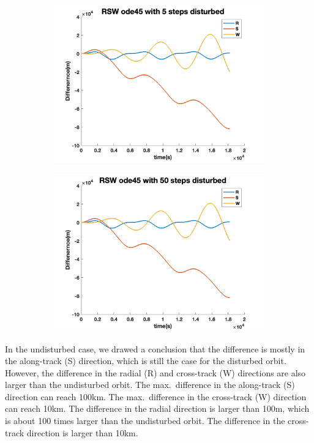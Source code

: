 \documentclass[12pt
,headinclude
,headsepline
,bibtotocnumbered
]{scrartcl}
\begin{document}
\begin{figure}[H]
\begin{subfigure}[b]{0.45\textwidth}
        \end{subfigure}
        \begin{subfigure}[b]{0.45\textwidth}
        \includegraphics[width=1\textwidth]{./plots/ode45_5_yprime_d_RSW.png}
        \end{subfigure}
        \begin{subfigure}[b]{0.45\textwidth}
        \includegraphics[width=1\textwidth]{./plots/ode45_50_yprime_d_RSW.png}
        \end{subfigure}
    \end{figure} 
    In the undisturbed case, we drawed a conclusion that the difference is mostly in the along-track (S) direction, which is still the case for the disturbed orbit. However, the difference in the radial (R) and cross-track (W) directions are also larger than the undisturbed orbit. The max.\ difference in the along-track (S) direction can reach 100km. The max.\ difference in the cross-track (W) direction can reach 10km. 
    The difference in the radial direction is larger than 100m, which is about 100 times larger than the undisturbed orbit. The difference in the cross-track direction is larger than 10km.
\end{document}
